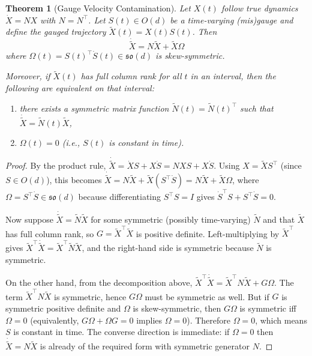 \documentclass{article}
\newcommand{\so}{\mathfrak{so}}
\theoremstyle{plain}
\newtheorem{theorem}{Theorem}
\theoremstyle{definition}
\theoremstyle{remark}
\begin{document}
\begin{theorem}[Gauge Velocity Contamination]\label{thm:gauge-contamination}
Let $X(t)$ follow true dynamics $\dot{X} = NX$ with $N = N^\top$.
Let $S(t) \in O(d)$ be a time-varying (mis)gauge and define the gauged trajectory $\tilde{X}(t) = X(t) S(t)$.
Then
\begin{equation}
\dot{\tilde{X}} = N \tilde{X} + \tilde{X} \Omega
\end{equation}
where $\Omega(t) = S(t)^\top \dot{S}(t) \in \so(d)$ is skew-symmetric.

Moreover, if $\tilde{X}(t)$ has full column rank for all $t$ in an interval, then the following are equivalent on that interval:
\begin{enumerate}
\item there exists a symmetric matrix function $\tilde{N}(t) = \tilde{N}(t)^\top$ such that $\dot{\tilde{X}} = \tilde{N}(t) \tilde{X}$,
\item $\Omega(t) = 0$ (i.e., $S(t)$ is constant in time).
\end{enumerate}
\end{theorem}

\begin{proof}
By the product rule,
$\dot{\tilde{X}} = \dot{X} S + X \dot{S} = NXS + X\dot{S}$.
Using $X = \tilde{X} S^\top$ (since $S \in O(d)$), this becomes
$\dot{\tilde{X}} = N \tilde{X} + \tilde{X} (S^\top \dot{S}) = N \tilde{X} + \tilde{X} \Omega$,
where $\Omega = S^\top \dot{S} \in \so(d)$ because differentiating $S^\top S = I$ gives $\dot{S}^\top S + S^\top \dot{S} = 0$.

Now suppose $\dot{\tilde{X}} = \tilde{N} \tilde{X}$ for some symmetric (possibly time-varying) $\tilde{N}$ and that $\tilde{X}$ has full column rank, so $G = \tilde{X}^\top \tilde{X}$ is positive definite.
Left-multiplying by $\tilde{X}^\top$ gives
$\tilde{X}^\top \dot{\tilde{X}} = \tilde{X}^\top \tilde{N} \tilde{X}$,
and the right-hand side is symmetric because $\tilde{N}$ is symmetric.

On the other hand, from the decomposition above,
$\tilde{X}^\top \dot{\tilde{X}} = \tilde{X}^\top N \tilde{X} + G \Omega$.
The term $\tilde{X}^\top N \tilde{X}$ is symmetric, hence $G \Omega$ must be symmetric as well.
But if $G$ is symmetric positive definite and $\Omega$ is skew-symmetric, then $G \Omega$ is symmetric iff $\Omega = 0$ (equivalently, $G \Omega + \Omega G = 0$ implies $\Omega = 0$).
Therefore $\Omega = 0$, which means $S$ is constant in time.
The converse direction is immediate: if $\Omega = 0$ then $\dot{\tilde{X}} = N \tilde{X}$ is already of the required form with symmetric generator $N$.
\end{proof}
\end{document}
